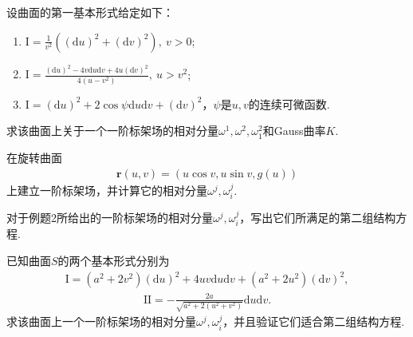 \documentclass[../../main.tex]{subfiles}%
\begin{document}
\begin{example}
设曲面的第一基本形式给定如下：
\begin{enumerate}[(1)]
\item $\mathrm{I}=\frac{1}{v^2}\left((\mathrm{d}u)^2+(\mathrm{d}v)^2\right),\ v>0$;
\item $\mathrm{I}=\frac{(\mathrm{d}u)^2-4v\mathrm{d}u\mathrm{d}v+4u(\mathrm{d}v)^2}{4\left(u-v^2\right)},\ u>v^2$;
\item $\mathrm{I}=(\mathrm{d}u)^2+2\cos\psi\mathrm{d}u\mathrm{d}v+(\mathrm{d}v)^2$，$\psi$是$u,v$的连续可微函数.
\end{enumerate}
求该曲面上关于一个一阶标架场的相对分量$\omega^1,\omega^2,\omega_1^2$和Gauss曲率$K$.
\end{example}

\begin{example}
在旋转曲面
\begin{align*}
\bm{r}(u,v)=(u\cos v,u\sin v,g(u))
\end{align*}
上建立一阶标架场，并计算它的相对分量$\omega^j,\omega_i^j$.
\end{example}

\begin{example}
对于例题2所给出的一阶标架场的相对分量$\omega^j,\omega_i^j$，写出它们所满足的第二组结构方程.
\end{example}

\begin{example}
已知曲面$S$的两个基本形式分别为
\begin{align*}
\mathrm{I}=(a^2+2v^2)(\mathrm{d}u)^2+4uv\mathrm{d}u\mathrm{d}v+(a^2+2u^2)(\mathrm{d}v)^2,
\end{align*}
\begin{align*}
\mathrm{II}=-\frac{2a}{\sqrt{a^2+2\left(u^2+v^2\right)}}\mathrm{d}u\mathrm{d}v.
\end{align*}
求该曲面上一个一阶标架场的相对分量$\omega^j,\omega_i^j$，并且验证它们适合第二组结构方程.
\end{example}
\end{document}
